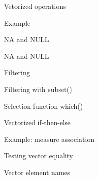 \documentclass[xcolor=x11names]{beamer}
\renewcommand{\(}{\begin{columns}}
\renewcommand{\)}{\end{columns}}
\newcommand{\<}[1]{\begin{column}{#1}}
\renewcommand{\>}{\end{column}}
\begin{document}
%	

%	

\begin{frame}{Vetorized operations}
	
\end{frame}

\begin{frame}{Example}
	
\end{frame}

\begin{frame}{NA and NULL}
	
\end{frame}

\begin{frame}{NA and NULL}
	
\end{frame}

\begin{frame}{Filtering}
	
\end{frame}

\begin{frame}{Filtering with subset()}
	
\end{frame}

\begin{frame}{Selection function which()}
	
\end{frame}

\begin{frame}{Vectorized if-then-else}
	
\end{frame}

\begin{frame}{Example: measure association}
	
\end{frame}

\begin{frame}{Testing vector equality}
	
\end{frame}

\begin{frame}{Vector element names}
	
\end{frame}
\end{document}
